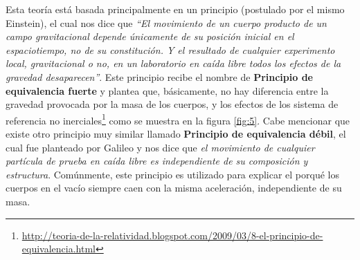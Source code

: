 Esta teoría está basada principalmente en un principio (postulado por el mismo Einstein), el cual nos dice que \textit{``El movimiento de un cuerpo producto de un campo gravitacional depende únicamente de su posición inicial en el espaciotiempo, no de su constitución. Y el resultado de cualquier experimento local, gravitacional o no, en un laboratorio en caída libre todos los efectos de la gravedad desaparecen''}. Este principio recibe el nombre de \textbf{Principio de equivalencia fuerte} y plantea que, básicamente, no hay diferencia entre la gravedad provocada por la masa de los cuerpos, y los efectos de los sistema de referencia no inerciales\footnote{\url{http://teoria-de-la-relatividad.blogspot.com/2009/03/8-el-principio-de-equivalencia.html}} como se muestra en la figura \ref{fig:5}. Cabe mencionar que existe otro principio muy similar llamado \textbf{Principio de equivalencia débil}, el cual fue planteado por Galileo y nos dice que \textit{el movimiento de cualquier partícula de prueba en caída libre es independiente de su composición y estructura}. Comúnmente, este principio es utilizado para explicar el porqué los cuerpos en el vacío siempre caen con la misma aceleración, independiente de su masa.
